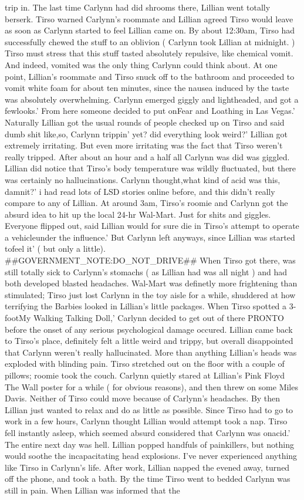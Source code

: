 \documentclass[12pt]{book}
\begin{document}
trip in. The last time Carlynn had did shrooms there, Lillian went totally berserk. Tirso warned Carlynn's roommate and Lillian agreed Tirso would leave as soon as Carlynn started to feel Lillian came on. By about 12:30am, Tirso had successfully chewed the stuff to an oblivion ( Carlynn took Lillian at midnight. ) Tirso must stress that this stuff tasted absolutely repulsive, like chemical vomit. And indeed, vomited was the only thing Carlynn could think about. At one point, Lillian's roommate and Tirso snuck off to the bathroom and proceeded to vomit white foam for about ten minutes, since the nausea induced by the taste was absolutely overwhelming. Carlynn emerged giggly and lightheaded, and got a fewlooks.' From here someone decided to put onFear and Loathing in Las Vegas.' Naturally Lillian got the usual rounds of people checked up on Tirso and said dumb shit like,so, Carlynn trippin' yet? did everything look weird?' Lillian got extremely irritating. But even more irritating was the fact that Tirso weren't really tripped. After about an hour and a half all Carlynn was did was giggled. Lillian did notice that Tirso's body temperature was wildly fluctuated, but there was certainly no hallucinations. Carlynn thought,what kind of acid was this, damnit?' i had read lots of LSD stories online before, and this didn't really compare to any of Lillian. At around 3am, Tirso's roomie and Carlynn got the absurd idea to hit up the local 24-hr Wal-Mart. Just for shits and giggles. Everyone flipped out, said Lillian would for sure die in Tirso's attempt to operate a vehicleunder the influence.' But Carlynn left anyways, since Lillian was started tofeel it' ( but only a little). \#\#GOVERNMENT\_NOTE:DO\_NOT\_DRIVE\#\# When Tirso got there, was still totally sick to Carlynn's stomachs ( as Lillian had was all night ) and had both developed blasted headaches. Wal-Mart was definetly more frightening than stimulated; Tirso just lost Carlynn in the toy aisle for a while, shuddered at how terrifying the Barbies looked in Lillian's little packages. When Tirso spotted a 3-footMy Walking Talking Doll,' Carlynn decided to get out of there PRONTO before the onset of any serious psychological damage occured. Lillian came back to Tirso's place, definitely felt a little weird and trippy, but overall disappointed that Carlynn weren't really hallucinated. More than anything Lillian's heads was exploded with blinding pain. Tirso stretched out on the floor with a couple of pillows; roomie took the couch. Carlynn quietly stared at Lillian's Pink Floyd The Wall poster for a while ( for obvious reasons), and then threw on some Miles Davis. Neither of Tirso could move because of Carlynn's headaches. By then Lillian just wanted to relax and do as little as possible. Since Tirso had to go to work in a few hours, Carlynn thought Lillian would attempt took a nap. Tirso fell instantly asleep, which seemed absurd considered that Carlynn was onacid.' The entire next day was hell. Lillian popped handfuls of painkillers, but nothing would soothe the incapacitating head explosions. I've never experienced anything like Tirso in Carlynn's life. After work, Lillian napped the evened away, turned off the phone, and took a bath. By the time Tirso went to bedded Carlynn was still in pain. When Lillian was informed that the 
\end{document}
